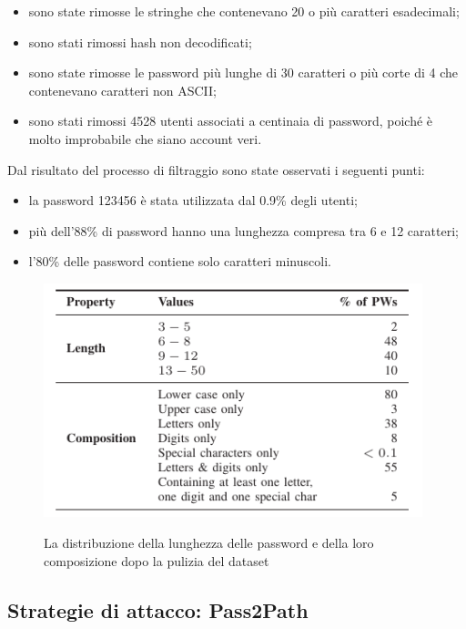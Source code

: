 \begin{itemize}
    \item sono state rimosse le stringhe che contenevano 20 o più caratteri esadecimali;
    \item sono stati rimossi hash non decodificati;
    \item sono state rimosse le password più lunghe di 30 caratteri o più corte di 4 che contenevano caratteri non ASCII;
    \item sono stati rimossi 4528 utenti associati a centinaia di password, poiché è molto improbabile che siano account veri.
\end{itemize}

Dal risultato del processo di filtraggio sono state osservati i seguenti punti:
\begin{itemize}
    \item la password 123456 è stata utilizzata dal 0.9\% degli utenti;
    \item più dell'88\% di password hanno una lunghezza compresa tra 6 e 12 caratteri;
    \item l'80\% delle password contiene solo caratteri minuscoli.
\end{itemize}

\begin{figure}[h]
    \centering
    \includegraphics[width=11cm]{./immagini/pulizia_dataset_biijeta.png}
    \label{pulizia dataset}
    \caption{La distribuzione della lunghezza delle password e della loro composizione dopo la pulizia del dataset~\cite{biijeta}}
\end{figure}



\subsection{Strategie di attacco: Pass2Path}
